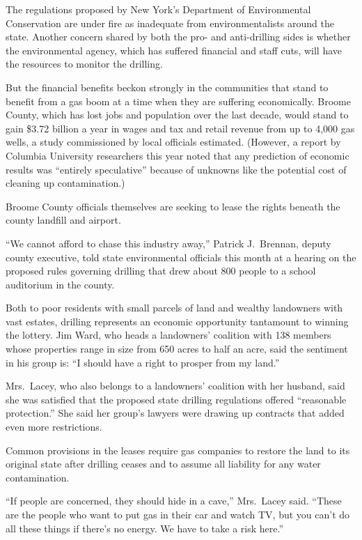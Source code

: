 ﻿\documentclass[12pt]{article}
\begin{document}
The regulations proposed by New York's Department of Environmental Conservation are under fire as
inadequate from environmentalists around the state. Another concern shared by both the pro- and
anti-drilling sides is whether the environmental agency, which has suffered financial and staff
cuts, will have the resources to monitor the drilling.

But the financial benefits beckon\cite{beckon} strongly in the communities that stand to benefit
from a gas boom at a time when they are suffering economically. Broome County, which has lost jobs
and population over the last decade, would stand to gain \$3.72 billion a year in wages and tax and
retail revenue from up to 4,000 gas wells, a study commissioned by local officials estimated.
(However, a report by Columbia University researchers this year noted that any prediction of
economic results was ``entirely speculative'' because of unknowns like the potential cost of
cleaning up contamination.)

Broome County officials themselves are seeking to lease the rights beneath the county landfill and
airport.

``We cannot afford to chase this industry away,'' Patrick J.~Brennan, deputy county executive, told
state environmental officials this month at a hearing on the proposed rules governing drilling that
drew about 800 people to a school auditorium in the county.

Both to poor residents with small parcels of land and wealthy landowners with vast estates, drilling
represents an economic opportunity tantamount to winning the lottery. Jim Ward, who heads a
landowners' coalition with 138 members whose properties range in size from 650 acres to half an
acre, said the sentiment in his group is: ``I should have a right to prosper from my land.''

Mrs.~Lacey, who also belongs to a landowners' coalition with her husband, said she was satisfied
that the proposed state drilling regulations offered ``reasonable protection.'' She said her group's
lawyers were drawing up contracts that added even more restrictions.

Common provisions in the leases require gas companies to restore the land to its original state
after drilling ceases and to assume all liability for any water contamination.

``If people are concerned, they should hide in a cave,'' Mrs.~Lacey said. ``These are the people who
want to put gas in their car and watch TV, but you can't do all these things if there's no energy.
We have to take a risk here.''
\end{document}
